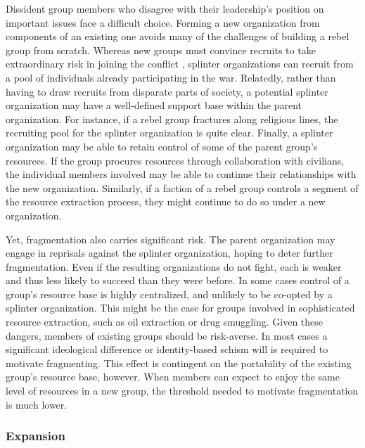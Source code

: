 Dissident group members who disagree with their leadership's position on important issues face a difficult choice. Forming a new organization from components of an existing one avoids many of the challenges of building a rebel group from scratch. Whereas new groups must convince recruits to take extraordinary risk in joining the conflict \citep{Lichbach1995}, splinter organizations can recruit from a pool of individuals already participating in the war. Relatedly, rather than having to draw recruits from disparate parts of society, a potential splinter organization may have a well-defined support base within the parent organization. For instance, if a rebel group fractures along religious lines, the recruiting pool for the splinter organization is quite clear. Finally, a splinter organization may be able to retain control of some of the parent group's resources. If the group procures resources through collaboration with civilians, the individual members involved may be able to continue their relationships with the new organization. Similarly, if a faction of a rebel group controls a segment of the resource extraction process, they might continue to do so under a new organization.

Yet, fragmentation also carries significant risk. The parent organization may engage in reprisals against the splinter organization, hoping to deter further fragmentation. Even if the resulting organizations do not fight, each is weaker and thus less likely to succeed than they were before. In some cases control of a group's resource base is highly centralized, and unlikely to be co-opted by a splinter organization. This might be the case for groups involved in sophisticated resource extraction, such as oil extraction or drug smuggling. Given these dangers, members of existing groups should be risk-averse. In most cases a significant ideological difference or identity-based schism will is required to motivate fragmenting. This effect is contingent on the portability of the existing group's resource base, however. When members can expect to enjoy the same level of resources in a new group, the threshold needed to motivate fragmentation is much lower.

\subsubsection{Expansion}

